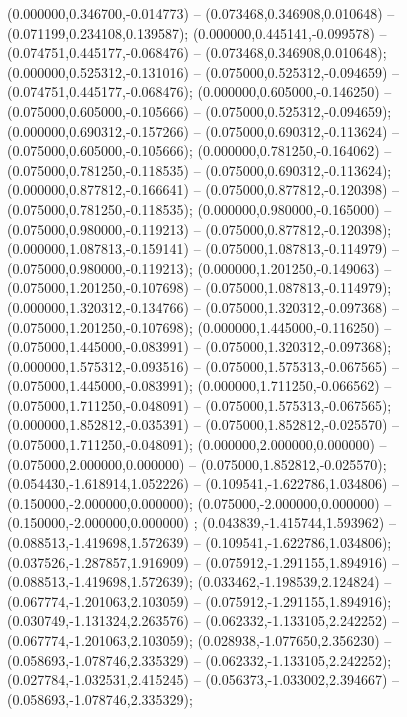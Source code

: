  (0.000000,0.346700,-0.014773) -- (0.073468,0.346908,0.010648) -- (0.071199,0.234108,0.139587);
 (0.000000,0.445141,-0.099578) -- (0.074751,0.445177,-0.068476) -- (0.073468,0.346908,0.010648);
 (0.000000,0.525312,-0.131016) -- (0.075000,0.525312,-0.094659) -- (0.074751,0.445177,-0.068476);
 (0.000000,0.605000,-0.146250) -- (0.075000,0.605000,-0.105666) -- (0.075000,0.525312,-0.094659);
 (0.000000,0.690312,-0.157266) -- (0.075000,0.690312,-0.113624) -- (0.075000,0.605000,-0.105666);
 (0.000000,0.781250,-0.164062) -- (0.075000,0.781250,-0.118535) -- (0.075000,0.690312,-0.113624);
 (0.000000,0.877812,-0.166641) -- (0.075000,0.877812,-0.120398) -- (0.075000,0.781250,-0.118535);
 (0.000000,0.980000,-0.165000) -- (0.075000,0.980000,-0.119213) -- (0.075000,0.877812,-0.120398);
 (0.000000,1.087813,-0.159141) -- (0.075000,1.087813,-0.114979) -- (0.075000,0.980000,-0.119213);
 (0.000000,1.201250,-0.149063) -- (0.075000,1.201250,-0.107698) -- (0.075000,1.087813,-0.114979);
 (0.000000,1.320312,-0.134766) -- (0.075000,1.320312,-0.097368) -- (0.075000,1.201250,-0.107698);
 (0.000000,1.445000,-0.116250) -- (0.075000,1.445000,-0.083991) -- (0.075000,1.320312,-0.097368);
 (0.000000,1.575312,-0.093516) -- (0.075000,1.575313,-0.067565) -- (0.075000,1.445000,-0.083991);
 (0.000000,1.711250,-0.066562) -- (0.075000,1.711250,-0.048091) -- (0.075000,1.575313,-0.067565);
 (0.000000,1.852812,-0.035391) -- (0.075000,1.852812,-0.025570) -- (0.075000,1.711250,-0.048091);
 (0.000000,2.000000,0.000000) -- (0.075000,2.000000,0.000000) -- (0.075000,1.852812,-0.025570);
 (0.054430,-1.618914,1.052226) -- (0.109541,-1.622786,1.034806) -- (0.150000,-2.000000,0.000000);
 (0.075000,-2.000000,0.000000) -- (0.150000,-2.000000,0.000000) ;
 (0.043839,-1.415744,1.593962) -- (0.088513,-1.419698,1.572639) -- (0.109541,-1.622786,1.034806);
 (0.037526,-1.287857,1.916909) -- (0.075912,-1.291155,1.894916) -- (0.088513,-1.419698,1.572639);
 (0.033462,-1.198539,2.124824) -- (0.067774,-1.201063,2.103059) -- (0.075912,-1.291155,1.894916);
 (0.030749,-1.131324,2.263576) -- (0.062332,-1.133105,2.242252) -- (0.067774,-1.201063,2.103059);
 (0.028938,-1.077650,2.356230) -- (0.058693,-1.078746,2.335329) -- (0.062332,-1.133105,2.242252);
 (0.027784,-1.032531,2.415245) -- (0.056373,-1.033002,2.394667) -- (0.058693,-1.078746,2.335329);
